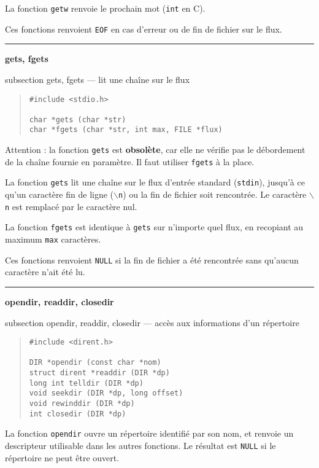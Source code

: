 \documentclass [twoside] {report}
\newcommand {\primitive} [1]
    {
	\phantomsection
	{\large \bf #1}
	\addcontentsline {toc} {subsection} {#1}
    }
\newcommand {\separation}
    {
	\vspace {5mm}
	\nopagebreak
	\hrule
    }
\begin{document}
La fonction {\tt getw} renvoie le prochain mot ({\tt int} en C).

Ces fonctions renvoient {\tt EOF} en cas d'erreur ou de fin de
fichier sur le flux.



\separation
\primitive {gets, fgets} --- lit une chaîne sur le flux

\begin {quote}
\begin {verbatim}
#include <stdio.h>

char *gets (char *str)
char *fgets (char *str, int max, FILE *flux)
\end{verbatim}
\end {quote}

Attention : la fonction \texttt {gets} est \textbf {obsolète}, car elle ne
vérifie pas le débordement de la chaîne fournie en paramètre. Il
faut utiliser \texttt {fgets} à la place.

La fonction {\tt gets} lit une chaîne sur le flux d'entrée
standard ({\tt stdin}), jusqu'à ce qu'un caractère fin de ligne
({\tt $\backslash$n}) ou la fin de fichier soit rencontrée. Le caractère
{\tt $\backslash$n} est remplacé par le caractère nul.

La fonction {\tt fgets} est identique à {\tt gets} sur n'importe
quel flux, en recopiant au maximum {\tt max} caractères.

Ces fonctions renvoient {\tt NULL} si la fin de fichier a été
rencontrée sans qu'aucun caractère n'ait été lu.


\separation
\primitive {opendir, readdir, closedir} --- accès aux informations d'un répertoire
    \label {opendir}

\begin {quote}
\begin {verbatim}
#include <dirent.h>

DIR *opendir (const char *nom)
struct dirent *readdir (DIR *dp)
long int telldir (DIR *dp)
void seekdir (DIR *dp, long offset)
void rewinddir (DIR *dp)
int closedir (DIR *dp)
\end{verbatim}
\end {quote}

La fonction {\tt opendir} ouvre un répertoire identifié par son nom, et
renvoie un descripteur utilisable dans les autres fonctions. Le résultat
est {\tt NULL} si le répertoire ne peut être ouvert.
\end{document}
